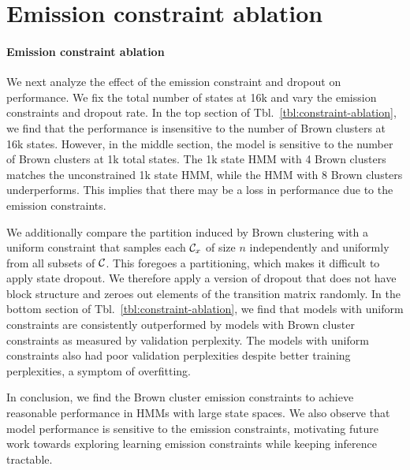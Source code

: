 \documentclass[11pt,a4paper]{article}
\begin{document}
\section{Emission constraint ablation}

\paragraph{Emission constraint ablation}
We next analyze the effect of the emission constraint and dropout on performance.
We fix the total number of states at 16k 
and vary the emission constraints and dropout rate.
In the top section of Tbl.~\ref{tbl:constraint-ablation},
we find that the performance is
insensitive to the number of Brown clusters at 16k states.
However, in the middle section,
the model is sensitive to the number of Brown clusters
at 1k total states.
The 1k state HMM with 4 Brown clusters matches the unconstrained 1k state HMM,
while the HMM with 8 Brown clusters underperforms.
This implies that there may be a loss in performance due to the emission constraints.

We additionally compare the partition induced by Brown clustering with a uniform
constraint that samples each $\mathcal{C}_x$ of size $n$
independently and uniformly from all subsets of $\mathcal{C}$.
This foregoes a partitioning, which makes it difficult to apply state dropout.
We therefore apply a version of dropout that does not have block structure
and zeroes out elements of the transition matrix randomly.
In the bottom section of Tbl.~\ref{tbl:constraint-ablation},
we find that models with uniform constraints
are consistently outperformed by models with Brown cluster constraints
as measured by validation perplexity.
The models with uniform constraints also had poor validation perplexities
despite better training perplexities, a symptom of overfitting.

In conclusion,
we find the Brown cluster emission constraints to achieve reasonable performance
in HMMs with large state spaces.
We also observe that model performance is sensitive to the emission constraints,
motivating future work towards exploring learning emission constraints
while keeping inference tractable. 
\end{document}
